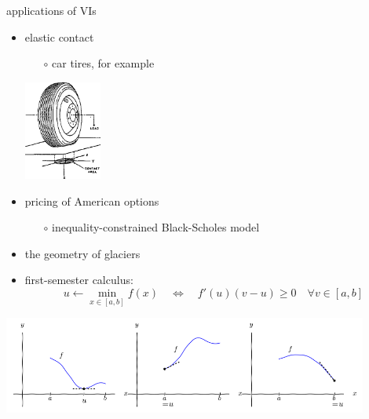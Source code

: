 \documentclass[svgnames,
               hyperref={colorlinks,citecolor=DeepPink4,linkcolor=FireBrick,urlcolor=Maroon},
               usepdftitle=false]  %
               {beamer}
\begin{document}
\begin{frame}{applications of VIs}

\begin{itemize}
\item elastic contact
    \begin{itemize}
    \item[$\circ$] car tires, for example
    \end{itemize}

\vspace{-10mm}
\hfill \includegraphics[width=0.2\textwidth]{../talk-dms/figs/tirecontact.png}

\vspace{-20mm}
\item pricing of American options
    \begin{itemize}
    \item[$\circ$] inequality-constrained Black-Scholes model
    \end{itemize}

\vspace{1.5mm}
\item the geometry of glaciers %

\vspace{3mm}
\item first-semester calculus:
    $$u \gets \min_{x\in[a,b]} f(x) \quad \iff \quad f'(u)(v-u) \ge 0 \quad \forall v \in[a,b]$$
\end{itemize}

\begin{center}
\includegraphics[width=0.9\textwidth]{../talk-oxford/images/calcone.png}
\end{center}
\end{frame}
\end{document}

